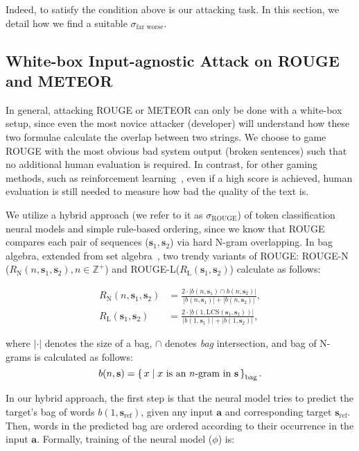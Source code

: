 \documentclass[11pt]{article}
\newcommand{\abs}[1]{\left\lvert#1\right\rvert}
\theoremstyle{remark}
\begin{document}
Indeed, to satisfy the condition above is our attacking task. In this section, we detail how we find a suitable $\sigma_\text{far worse}$.

\subsection{White-box Input-agnostic Attack on ROUGE and METEOR}
In general, attacking ROUGE or METEOR can only be done with a white-box setup, since even the most novice attacker (developer) will understand how these two formulae calculate the overlap between two strings. We choose to game ROUGE with the most obvious bad system output (broken sentences) such that no additional human evaluation is required. In contrast, for other gaming methods, such as reinforcement learning~\cite{paulus2018a}, even if a high score is achieved, human evaluation is still needed to measure how bad the quality of the text is.

We utilize a hybrid approach (we refer to it as $\sigma_\text{ROUGE}$) of token classification neural models and simple rule-based ordering, since we know that ROUGE compares each pair of sequences ($\mathbf{s}_1, \mathbf{s}_2$) via hard N-gram overlapping. In bag algebra, extended from set algebra~\cite{bertossi2018datalog}, two trendy variants of ROUGE: ROUGE-N ($R_{\text{N}}(n, \mathbf{s}_1, \mathbf{s}_2), n \in\mathbb{Z}^+$) and ROUGE-L($R_{\text{L}}(\mathbf{s}_1, \mathbf{s}_2)$) calculate as follows:

\begin{align} 
    R_{\text{N}}(n, \mathbf{s}_1, \mathbf{s}_2) &= \frac{2\cdot\abs{b(n, \mathbf{s}_1) \cap b(n, \mathbf{s}_2)}}{\abs{b(n, \mathbf{s}_1)} + \abs{b(n, \mathbf{s}_2)}}, \\
    R_{\text{L}}(\mathbf{s}_1, \mathbf{s}_2) &=
    \frac{2\cdot \abs{b(1, \text{LCS}(\mathbf{s}_1, \mathbf{s}_1))}}{\abs{b(1, \mathbf{s}_1)} + \abs{b(1, \mathbf{s}_2)}},
\end{align}

where $\abs{\cdot}$ denotes the size of a bag, $\cap$ denotes  \emph{bag} intersection, and bag of N-grams is calculated as follows:
\begin{equation}\label{eq:bag}
    b(n, \mathbf{s}) = \set{x\mid x \text{ is an } n\text{-gram in } \mathbf{s}}_{\text{bag}}.
\end{equation}


In our hybrid approach, the first step is that the neural model tries to predict the target's bag of words $b(1, \mathbf{s}_\text{ref})$, given any input $\mathbf{a}$ and corresponding target $\mathbf{s}_\text{ref}$. Then, words in the predicted bag are ordered according to their occurrence in the input $\mathbf{a}$. Formally, training of the neural model ($\phi$) is:
\end{document}

